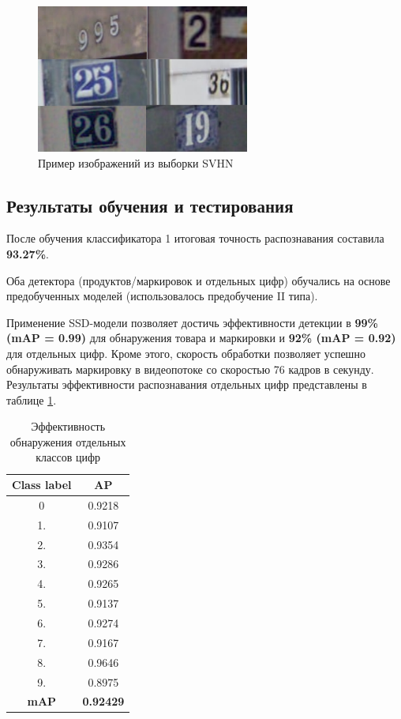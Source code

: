 \begin{figure}[ht]
	\centering
	\includegraphics[width=7cm]{man-source/images/ch4/pic4-14.png}
	\caption{Пример изображений из выборки SVHN}
	\label{fig:svhn_dataset}
\end{figure}

\subsection{Результаты обучения и тестирования} 
После обучения классификатора 1 итоговая точность распознавания составила \textbf{93.27\%}.

Оба детектора (продуктов/маркировок и отдельных цифр) обучались на основе предобученных моделей (использовалось предобучение II типа).

Применение SSD-модели позволяет достичь эффективности детекции в \textbf{99\% (mAP = 0.99)} для обнаружения товара и маркировки и \textbf{92\% (mAP = 0.92)} для отдельных цифр. Кроме этого, скорость обработки позволяет успешно обнаруживать маркировку в видеопотоке со скоростью 76 кадров в секунду. Результаты эффективности распознавания отдельных цифр представлены в таблице \ref{tab:efficiency_detector1}.  

\begin{table}[h]
\caption{Эффективность обнаружения отдельных классов цифр}
\centering
\begin{tabular}{ | c | c |  }
\hline
Class label & AP \\ \hline
0 & 0.9218\\
1. & 0.9107\\
2. & 0.9354\\
3. & 0.9286\\
4. & 0.9265\\
5. & 0.9137\\
6. & 0.9274\\
7. & 0.9167\\
8. & 0.9646\\
9. & 0.8975\\
\hline
\textbf{mAP} & \textbf{0.92429}\\
\hline
\end{tabular}
\label{tab:efficiency_detector1}
\end{table}

